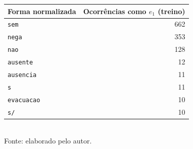 \begin{quadro}[htbp]
  \centering
  \caption{Léxico de pistas congelado (D4): \texttt{min\_freq}$=10$, 8 formas, \texttt{lexico\_sha1} \texttt{8af0716633e9}.}
  \label{quad:lexico}
  \begin{tabular}{lr}
  \toprule
  Forma normalizada & Ocorrências como $e_1$ (treino) \\
  \midrule
  \texttt{sem} & 662 \\
  \texttt{nega} & 353 \\
  \texttt{nao} & 128 \\
  \texttt{ausente} & 12 \\
  \texttt{ausencia} & 11 \\
  \texttt{s} & 11 \\
  \texttt{evacuacao} & 10 \\
  \texttt{s/} & 10 \\
  \bottomrule
  \end{tabular}\\[4pt]
  {\footnotesize Fonte: elaborado pelo autor.}
\end{quadro}
